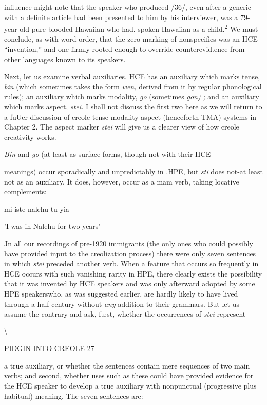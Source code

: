 influence might note that the speaker who produced /36/, even after a generic with a definite article had been presented to him by his inter\-viewer, was a 79-year-old pure-blooded Hawaiian who had. spoken Hawaiian as a child.\textsuperscript{2} We must conclude, as with word order, that the zero marking of nonspecifics was an HCE ``invention,'' and one firmly rooted enough to override counterevid.ence from other languages known to its speakers.

Next, let us examine verbal auxiliaries. HCE has an auxiliary which marks tense, \textit{bin} (which sometimes takes the form \textit{wen,} derived from it by regular phonological rules); an auxiliary which marks modal\-ity, \textit{go }(sometimes \textit{go}\textit{n}\textit{)} \textit{; }and an auxiliary which marks aspect, \textit{stei.} I shall not discuss the first two here as we will return to a fuUer discus\-sion of creole tense-modality-aspect (henceforth TMA) systems in Chapter 2. The aspect marker \textit{stei} will give us a clearer view of how creole creativity works.

\textit{Bin }and \textit{go }(at least as surface forms, though not with their HCE

meanings) occur sporadically and unpredictably in .HPE, but \textit{s}\textit{t}\textit{i} does not-at least not as an auxiliary. It does, however, occur as a mam verb, taking locative complements:

\ea\label{ex:44}
 mi iste nalehu tu yia
\glt
\z

'I was in Nalehu for two years'

Jn all our recordings of pre{}-1920 immigrants (the only ones who could possibly have provided input to the creolization process) there were only seven sentences in which \textit{stei} preceded another verb. When a feature that occurs so frequently in HCE occurs with such vanishing rarity in HPE, there clearly exists the possibility that it was invented by HCE speakers and was only afterward adopted by some HPE speakers\-who, as was suggested earlier, are hardly likely to have lived through a half-century without \textit{any} addition to their grammars. But let us assume the contrary and ask, fu:st, whether the occurrences of \textit{stei} represent

{\textbackslash}

PIDGIN INTO CREOLE 27

a true auxiliary, or whether the sentences contain mere sequences of two main verbs; and second, whether uses such as these could have provided evidence for the HCE speaker to develop a true auxiliary with nonpunctual (progressive plus habitual) meaning. The seven sentences are:

